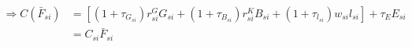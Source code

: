 \begin{equation*}
    \begin{split}
        \Rightarrow C(\bar{F}_{si}) &  = \left[
            (1+ \tau_{G_{si}}) r^{G}_{si}G_{si} + (1+ \tau_{B_{si}}) r^{K}_{si}B_{si} + (1+ \tau_{l_{si}}) w_{si}l_{si}
        \right] + {\tau_{E} E_{si}} \\
        & = C_{si} \bar{F}_{si}  \\
    \end{split}
\end{equation*}